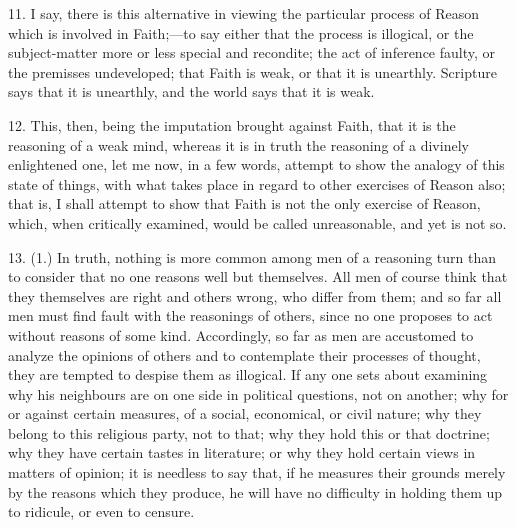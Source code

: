 11. I say, there is this alternative in viewing the particular
process of Reason which is involved in Faith;—to say either that the
process is illogical, or the subject-matter more or less special and
recondite; the act of inference faulty, or the premisses undeveloped;
that Faith is weak, or that it is unearthly. Scripture says that it is
unearthly, and the world says that it is weak.

12. This, then, being the imputation brought against Faith, that it
is the reasoning of a weak mind, whereas it is in truth the reasoning
of a divinely enlightened one, let me now, in a few words, attempt to
show the analogy of this state of things, with what takes place in
regard to other exercises of Reason also; that is, I shall attempt to
show that Faith is not the only exercise of Reason, which, when
critically examined, would be called unreasonable, and yet is not so.

13. (1.) In truth, nothing is more common among men of a reasoning
turn than to consider that no one reasons well but themselves. All men
of course think that they themselves are right and others wrong, who
differ from them; and so far all men must find fault with the
reasonings of others, since no one proposes to act without reasons of
some kind. Accordingly, so far as men are accustomed to analyze the
opinions of others and to contemplate their processes of thought, they
are tempted to despise them as illogical. If any one sets about
examining why his neighbours are on one side in political questions,
not on another; why for or against certain measures, of a social,
economical, or civil nature; why they belong to this religious party,
not to that; why they hold this or that doctrine; why they have
certain tastes in literature; or why they hold certain views in
matters of opinion; it is needless to say that, if he measures their
grounds merely by the reasons which they produce, he will have no
difficulty in holding them up to ridicule, or even to censure.

